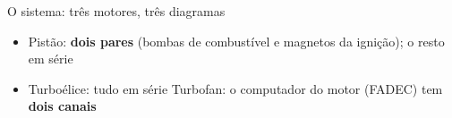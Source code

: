 \documentclass[aspectratio=169,11pt]{beamer}
\newcommand{\destaque}[1]{{\color{ieeeblue}\bfseries #1}}
\begin{document}
\begin{frame}{O sistema: três motores, três diagramas}
  \centering
  \makebox[\linewidth]{\resizebox{0.97\paperwidth}{!}{}}
  \vspace{2mm}
  {\small\raggedright
  \begin{itemize}
    \item Pistão: \destaque{dois pares} (bombas de combustível e magnetos da ignição); o resto em série
    \item Turboélice: tudo em série \quad\textbar\quad Turbofan: o computador do motor (FADEC) tem \destaque{dois canais}
  \end{itemize}\par}
\end{frame}
\end{document}

